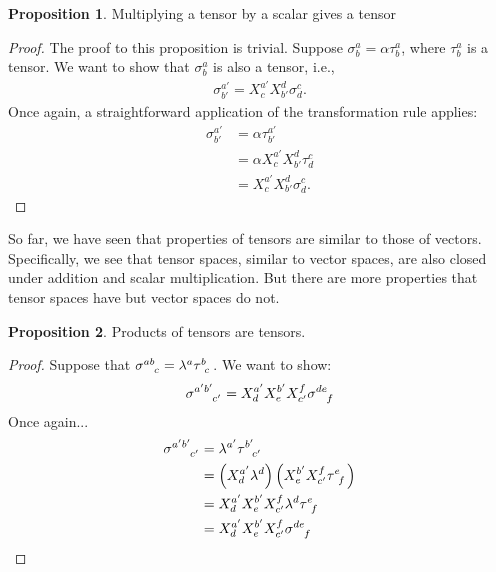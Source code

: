 \documentclass{article}
\theoremstyle{definition}
\newtheorem{prop}{Proposition}[section]
\begin{document}
\begin{prop}
	Multiplying a tensor by a scalar gives a tensor
\end{prop}
\begin{proof}
	The proof to this proposition is trivial. Suppose $\sigma^a_b = \alpha \tau^a_b$, where $\tau^a_b$ is a tensor. We want to show that $\sigma^a_b$ is also a tensor, i.e.,
	\begin{align*}
	\sigma^{a'}_{b'} = X^{a'}_{c}X^d_{b'}\sigma^{c}_d.
	\end{align*}
	Once again, a straightforward application of the transformation rule applies:
	\begin{align*}
	\sigma^{a'}_{b'} &= \alpha\tau^{a'}_{b'}\\
	&= \alpha X^{a'}_{c}X^d_{b'}\tau^{c}_{d}\\
	&= X^{a'}_{c}X^d_{b'} \sigma^{c}_d.
	\end{align*}
\end{proof}

So far, we have seen that properties of tensors are similar to those of vectors. Specifically, we see that tensor spaces, similar to vector spaces, are also closed under addition and scalar multiplication. But there are more properties that tensor spaces have but vector spaces do not.

\begin{prop}
	Products of tensors are tensors.
\end{prop}
\begin{proof}
	Suppose that $\tensor{\sigma}{^{ab}_c} = \lambda^a \tensor{\tau}{^b_c}$. We want to show:
	\begin{align*}
	\tensor{\sigma}{^{a'b'}_{c'}} = X^{a'}_{d}X^{b'}_{e}X^{f}_{c'}\tensor{\sigma}{^{de}_f}
	\end{align*}
	Once again...
	\begin{align*}
	\tensor{\sigma}{^{a'b'}_{c'}} &= \lambda^{a'}\tensor{\tau}{^{b'}_{c'}}\\
	&= \left(X^{a'}_d \lambda^d \right) \left( X^{b'}_eX^f_{c'}\tensor{\tau}{^e_f}\right) \\
	&= X^{a'}_dX^{b'}_eX^f_{c'}\lambda^d\tensor{\tau}{^e_f}\\
	&= X^{a'}_{d}X^{b'}_{e}X^{f}_{c'}\tensor{\sigma}{^{de}_f}
	\end{align*}
\end{proof}
\end{document}
